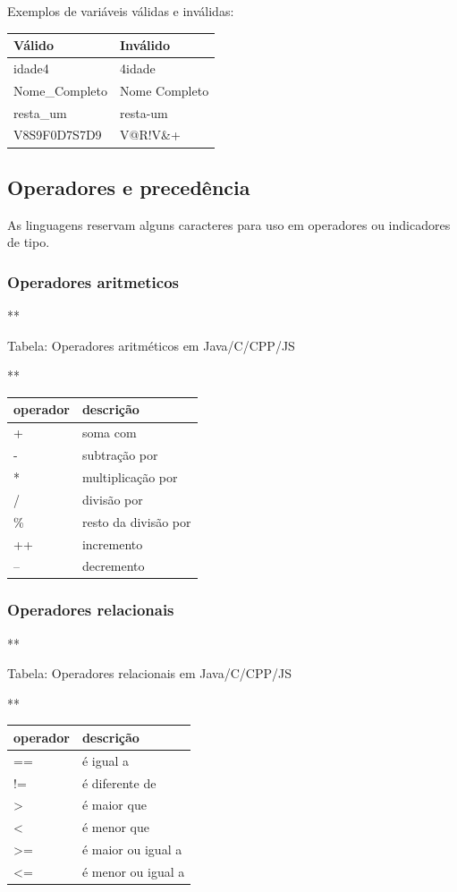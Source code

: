 \documentclass[12pt,a4paper]{article}
\begin{document}
    Exemplos de variáveis válidas e inválidas:

\begin{longtable}[]{@{}ll@{}}
\toprule
Válido & Inválido\tabularnewline
\midrule
\endhead
idade4 & 4idade\tabularnewline
Nome\_Completo & Nome Completo\tabularnewline
resta\_um & resta-um\tabularnewline
V8S9F0D7S7D9 & V@R!V\&+\tabularnewline
\bottomrule
\end{longtable}

    \hypertarget{operadores-e-preceduxeancia}{%
\subsection{Operadores e
precedência}\label{operadores-e-preceduxeancia}}

    As linguagens reservam alguns caracteres para uso em operadores ou
indicadores de tipo.

    \hypertarget{operadores-aritmeticos}{%
\subsubsection{Operadores aritmeticos}\label{operadores-aritmeticos}}

    **

Tabela: Operadores aritméticos em Java/C/CPP/JS

**

\begin{longtable}[]{@{}ll@{}}
\toprule
operador & descrição\tabularnewline
\midrule
\endhead
+ & soma com\tabularnewline
- & subtração por\tabularnewline
* & multiplicação por\tabularnewline
/ & divisão por\tabularnewline
\% & resto da divisão por\tabularnewline
++ & incremento\tabularnewline
-- & decremento\tabularnewline
\bottomrule
\end{longtable}

    \hypertarget{operadores-relacionais}{%
\subsubsection{Operadores relacionais}\label{operadores-relacionais}}

    **

Tabela: Operadores relacionais em Java/C/CPP/JS

**

\begin{longtable}[]{@{}ll@{}}
\toprule
operador & descrição\tabularnewline
\midrule
\endhead
== & é igual a\tabularnewline
!= & é diferente de\tabularnewline
\textgreater{} & é maior que\tabularnewline
\textless{} & é menor que\tabularnewline
\textgreater= & é maior ou igual a\tabularnewline
\textless= & é menor ou igual a\tabularnewline
\bottomrule
\end{longtable}
\end{document}
